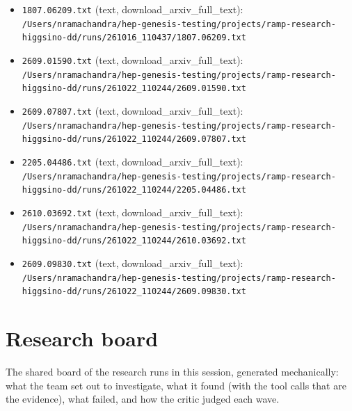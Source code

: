 \documentclass[11pt,a4paper]{article}
\begin{document}
\begin{itemize}
  \item \texttt{1807.06209.txt} (text, download\_arxiv\_full\_text): \texttt{/\allowbreak{}Users/\allowbreak{}nramachandra/\allowbreak{}hep-genesis-testing/\allowbreak{}projects/\allowbreak{}ramp-research-higgsino-dd/\allowbreak{}runs/\allowbreak{}261016\_\allowbreak{}110437/\allowbreak{}1807.06209.txt}
  \item \texttt{2609.01590.txt} (text, download\_arxiv\_full\_text): \texttt{/\allowbreak{}Users/\allowbreak{}nramachandra/\allowbreak{}hep-genesis-testing/\allowbreak{}projects/\allowbreak{}ramp-research-higgsino-dd/\allowbreak{}runs/\allowbreak{}261022\_\allowbreak{}110244/\allowbreak{}2609.01590.txt}
  \item \texttt{2609.07807.txt} (text, download\_arxiv\_full\_text): \texttt{/\allowbreak{}Users/\allowbreak{}nramachandra/\allowbreak{}hep-genesis-testing/\allowbreak{}projects/\allowbreak{}ramp-research-higgsino-dd/\allowbreak{}runs/\allowbreak{}261022\_\allowbreak{}110244/\allowbreak{}2609.07807.txt}
  \item \texttt{2205.04486.txt} (text, download\_arxiv\_full\_text): \texttt{/\allowbreak{}Users/\allowbreak{}nramachandra/\allowbreak{}hep-genesis-testing/\allowbreak{}projects/\allowbreak{}ramp-research-higgsino-dd/\allowbreak{}runs/\allowbreak{}261022\_\allowbreak{}110244/\allowbreak{}2205.04486.txt}
  \item \texttt{2610.03692.txt} (text, download\_arxiv\_full\_text): \texttt{/\allowbreak{}Users/\allowbreak{}nramachandra/\allowbreak{}hep-genesis-testing/\allowbreak{}projects/\allowbreak{}ramp-research-higgsino-dd/\allowbreak{}runs/\allowbreak{}261022\_\allowbreak{}110244/\allowbreak{}2610.03692.txt}
  \item \texttt{2609.09830.txt} (text, download\_arxiv\_full\_text): \texttt{/\allowbreak{}Users/\allowbreak{}nramachandra/\allowbreak{}hep-genesis-testing/\allowbreak{}projects/\allowbreak{}ramp-research-higgsino-dd/\allowbreak{}runs/\allowbreak{}261022\_\allowbreak{}110244/\allowbreak{}2609.09830.txt}
\end{itemize}

\section{Research board}
\label{app:board}
The shared board of the research runs in this session, generated mechanically: what the team set out to investigate, what it found (with the tool calls that are the evidence), what failed, and how the critic judged each wave.
\end{document}
